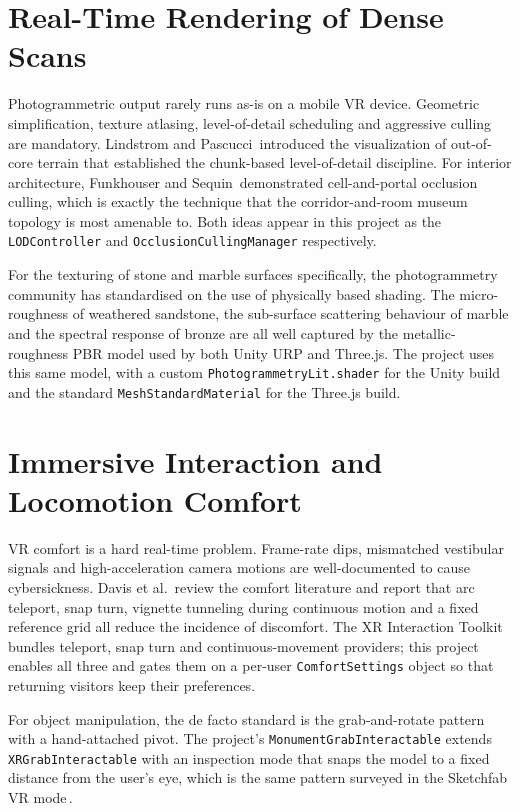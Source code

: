 \section{Real-Time Rendering of Dense Scans}

Photogrammetric output rarely runs as-is on a mobile VR device. Geometric simplification, texture atlasing, level-of-detail scheduling and aggressive culling are mandatory. Lindstrom and Pascucci\,\cite{lindstrom2002} introduced the visualization of out-of-core terrain that established the chunk-based level-of-detail discipline. For interior architecture, Funkhouser and Sequin\,\cite{funkhouser1993} demonstrated cell-and-portal occlusion culling, which is exactly the technique that the corridor-and-room museum topology is most amenable to. Both ideas appear in this project as the \texttt{LODController} and \texttt{OcclusionCullingManager} respectively.

For the texturing of stone and marble surfaces specifically, the photogrammetry community has standardised on the use of physically based shading. The micro-roughness of weathered sandstone, the sub-surface scattering behaviour of marble and the spectral response of bronze are all well captured by the metallic-roughness PBR model used by both Unity URP and Three.js. The project uses this same model, with a custom \texttt{PhotogrammetryLit.shader} for the Unity build and the standard \texttt{MeshStandardMaterial} for the Three.js build.

\section{Immersive Interaction and Locomotion Comfort}

VR comfort is a hard real-time problem. Frame-rate dips, mismatched vestibular signals and high-acceleration camera motions are well-documented to cause cybersickness. Davis et al.\,\cite{davis2014} review the comfort literature and report that arc teleport, snap turn, vignette tunneling during continuous motion and a fixed reference grid all reduce the incidence of discomfort. The XR Interaction Toolkit\,\cite{unity2024xrit} bundles teleport, snap turn and continuous-movement providers; this project enables all three and gates them on a per-user \texttt{ComfortSettings} object so that returning visitors keep their preferences.

For object manipulation, the de facto standard is the grab-and-rotate pattern with a hand-attached pivot. The project's \texttt{MonumentGrabInteractable} extends \texttt{XRGrabInteractable} with an inspection mode that snaps the model to a fixed distance from the user's eye, which is the same pattern surveyed in the Sketchfab VR mode\,\cite{sketchfab2018}.

